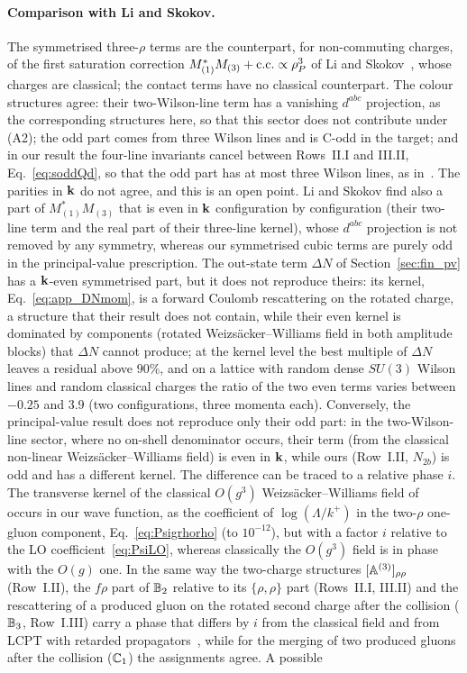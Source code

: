 \paragraph{Comparison with Li and Skokov.} The symmetrised three-$\rho$ terms are the counterpart, for non-commuting charges, of the first saturation correction $M_{(1)}^*M_{(3)}+{\rm c.c.}\propto\rho_P^3$ of Li and Skokov~\cite{Li:2021ntm}, whose charges are classical; the contact terms have no classical counterpart. The colour structures agree: their two-Wilson-line term has a vanishing $d^{abc}$ projection, as the corresponding structures here, so that this sector does not contribute under (A2); the odd part comes from three Wilson lines and is C-odd in the target; and in our result the four-line invariants cancel between Rows~II.I and III.II, Eq.~\eqref{eq:soddQd}, so that the odd part has at most three Wilson lines, as in~\cite{McLerran:2016snu,Li:2021ntm}. The parities in $\mathbf{k}$ do not agree, and this is an open point. Li and Skokov find also a part of $M_{(1)}^*M_{(3)}$ that is even in $\mathbf{k}$ configuration by configuration (their two-line term and the real part of their three-line kernel), whose $d^{abc}$ projection is not removed by any symmetry, whereas our symmetrised cubic terms are purely odd in the principal-value prescription. The out-state term $\Delta N$ of Section~\ref{sec:fin_pv} has a $\mathbf{k}$-even symmetrised part, but it does not reproduce theirs: its kernel, Eq.~\eqref{eq:app_DNmom}, is a forward Coulomb rescattering on the rotated charge, a structure that their result does not contain, while their even kernel is dominated by components (rotated Weizs\"acker--Williams field in both amplitude blocks) that $\Delta N$ cannot produce; at the kernel level the best multiple of $\Delta N$ leaves a residual above $90\%$, and on a lattice with random dense $SU(3)$ Wilson lines and random classical charges the ratio of the two even terms varies between $-0.25$ and $3.9$ (two configurations, three momenta each). Conversely, the principal-value result does not reproduce only their odd part: in the two-Wilson-line sector, where no on-shell denominator occurs, their term (from the classical non-linear Weizs\"acker--Williams field) is even in $\mathbf{k}$, while ours (Row~I.II, $N_{2b}$) is odd and has a different kernel. The difference can be traced to a relative phase $i$. The transverse kernel of the classical $O(g^3)$ Weizs\"acker--Williams field of~\cite{Li:2021ntm} occurs in our wave function, as the coefficient of $\log(\Lambda/k^+)$ in the two-$\rho$ one-gluon component, Eq.~\eqref{eq:Psigrhorho} (to $10^{-12}$), but with a factor $i$ relative to the LO coefficient~\eqref{eq:PsiLO}, whereas classically the $O(g^3)$ field is in phase with the $O(g)$ one. In the same way the two-charge structures $[\mathbb{A}^{(3)}]_{\rho\rho}$ (Row~I.II), the $f\rho$ part of $\mathbb{B}_2$ relative to its $\{\rho,\rho\}$ part (Rows~II.I, III.II) and the rescattering of a produced gluon on the rotated second charge after the collision ($\mathbb{B}_3$, Row~I.III) carry a phase that differs by $i$ from the classical field and from LCPT with retarded propagators~\cite{Kovchegov:2018jun}, while for the merging of two produced gluons after the collision ($\mathbb{C}_1$) the assignments agree. A possible 